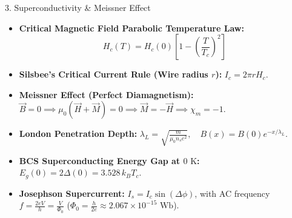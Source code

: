 \begin{formulabox}{3. Superconductivity \& Meissner Effect}
\begin{itemize}[leftmargin=*,itemsep=2pt]
    \item \textbf{Critical Magnetic Field Parabolic Temperature Law:}
    \[
    H_c(T) = H_c(0)\left[ 1 - \left(\frac{T}{T_c}\right)^2 \right]
    \]
    \item \textbf{Silsbee's Critical Current Rule (Wire radius $r$):} $I_c = 2\pi r H_c$.
    \item \textbf{Meissner Effect (Perfect Diamagnetism):} $\vec{B} = 0 \implies \mu_0(\vec{H} + \vec{M}) = 0 \implies \vec{M} = -\vec{H} \implies \chi_m = -1$.
    \item \textbf{London Penetration Depth:} $\lambda_L = \sqrt{\frac{m}{\mu_0 n_s e^2}}, \quad B(x) = B(0)e^{-x/\lambda_L}$.
    \item \textbf{BCS Superconducting Energy Gap at $0\text{ K}$:} $E_g(0) = 2\Delta(0) = 3.528\,k_B T_c$.
    \item \textbf{Josephson Supercurrent:} $I_s = I_c \sin(\Delta\phi)$, with AC frequency $f = \frac{2eV}{h} = \frac{V}{\Phi_0}$ ($\Phi_0 = \frac{h}{2e} \approx 2.067 \times 10^{-15}\text{ Wb}$).
\end{itemize}
\end{formulabox}
